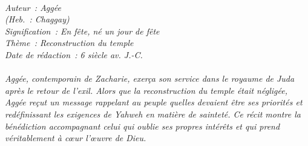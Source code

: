 \BFont
\noindent\hrulefill
{\footnotesize
\textit{
\bigskip
{\centering{}
\\Auteur~: Aggée
\\(Heb.~: Chaggay)
\\Signification~: En fête, né un jour de fête
\\Thème~: Reconstruction du temple
\\Date de rédaction~: 6 siècle av. J.-C.\\}
}
\textit{
\\Aggée, contemporain de Zacharie, exerça son service dans le royaume de Juda après le retour de l'exil. Alors que la reconstruction du temple était négligée, Aggée reçut un message rappelant au peuple quelles devaient être ses priorités et redéfinissant les exigences de Yahweh en matière de sainteté. Ce récit montre la bénédiction accompagnant celui qui oublie ses propres intérêts et qui prend véritablement à cœur l'œuvre de Dieu.\bigskip
}
}
\par\nobreak\noindent\hrulefill

